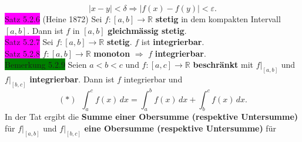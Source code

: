 \documentclass[landscape, 10pt]{article}
\newcommand{\R}{\mathbb{R}}
\begin{document}
\begin{multicols}{3}
                     \begin{equation*}
                            |x-y|<\delta
                            \Longrightarrow|
                            f(x)-f(y)|<\varepsilon. 
                     \end{equation*}
              \colorbox{magenta}{Satz 5.2.6} 
                     (Heine 1872) Sei 
                     \textcolor{NavyBlue}{
                     $f:[a,b]\longrightarrow\R$}
                     \textbf{stetig} in dem kompakten Intervall 
                     \textcolor{NavyBlue}{$[a,b]$}. 
                     Dann ist \textcolor{NavyBlue}{$f$} in 
                     \textcolor{NavyBlue}{$[a,b]$}
                     \textbf{gleichmässig stetig}.\\
              \colorbox{magenta}{Satz 5.2.7} 
                     Sei \textcolor{NavyBlue}{
                     $f:[a,b]\longrightarrow\R$} 
                     \textbf{stetig}. 
                     \textcolor{NavyBlue}{$f$} ist
                     \textbf{integrierbar}.\\
              \colorbox{magenta}{Satz 5.2.8} 
                     \textcolor{NavyBlue}{
                     $f:[a,b]\longrightarrow\R$} 
                     \textbf{monoton}
                     $\Rightarrow$
                     \textcolor{NavyBlue}{$f$} 
                     \textbf{integrierbar}.\\
              \colorbox{green}{Bemerkung 5.2.9} 
                     Seien \textcolor{NavyBlue}{$a<b<c$} und 
                     \textcolor{NavyBlue}{$f:[a,c]\longrightarrow\R$} 
                     \textbf{beschränkt} mit 
                     \textcolor{NavyBlue}{$f|_{[a,b]}$} und 
                     \textcolor{NavyBlue}{$f|_{[b,c]}$} 
                     \textbf{integrierbar}. Dann ist 
                     \textcolor{NavyBlue}{$f$} integrierbar und 
                     \begin{equation*}
                            (*)\enspace
                            \int_a^cf(x)\,dx
                            =\int_a^bf(x)\,dx
                            +\int_b^cf(x)\,dx.
                     \end{equation*}
                     In der Tat ergibt die 
                     \textbf{Summe einer Obersumme 
                     (respektive Untersumme)} für 
                     \textcolor{NavyBlue}{$f|_{[a,b]}$} und 
                     \textcolor{NavyBlue}{$f|_{[b,c]}$} 
                     \textbf{eine Obersumme (respektive 
                     Untersumme)} für 

\end{multicols}
\end{document}
